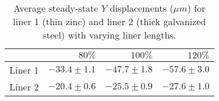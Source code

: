 \begin{table}[htbp!]
\centering
\begin{tabular}{lrrr}
\toprule
  & $80\%$ & $100\%$ & $120\%$ \\
\midrule
 Liner 1 & $-33.4 \pm 1.1$ & $-47.7 \pm 1.8$ & $-57.6 \pm 3.0$ \\
 Liner 2 & $-20.4 \pm 0.6$ & $-25.5 \pm 0.9$ & $-27.6 \pm 1.0$ \\
\bottomrule
\end{tabular}
\caption{Average steady-state $Y$ displacements ($\mu m$) for liner 1 (thin zinc) and liner 2 (thick galvanized steel) with varying liner lengths.}
\label{fig:avg_results_table}
\end{table}